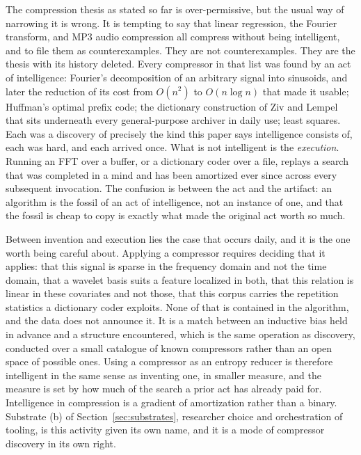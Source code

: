 \documentclass[11pt]{article}
\begin{document}
The compression thesis as stated so far is over-permissive, but the usual way of narrowing it is wrong. It is tempting to say that linear regression, the Fourier transform, and MP3 audio compression all compress without being intelligent, and to file them as counterexamples. They are not counterexamples. They are the thesis with its history deleted. Every compressor in that list was found by an act of intelligence: Fourier's decomposition of an arbitrary signal into sinusoids, and later the reduction of its cost from $O(n^2)$ to $O(n\log n)$ that made it usable; Huffman's optimal prefix code; the dictionary construction of Ziv and Lempel that sits underneath every general-purpose archiver in daily use; least squares. Each was a discovery of precisely the kind this paper says intelligence consists of, each was hard, and each arrived once. What is not intelligent is the \emph{execution}. Running an FFT over a buffer, or a dictionary coder over a file, replays a search that was completed in a mind and has been amortized ever since across every subsequent invocation. The confusion is between the act and the artifact: an algorithm is the fossil of an act of intelligence, not an instance of one, and that the fossil is cheap to copy is exactly what made the original act worth so much.

Between invention and execution lies the case that occurs daily, and it is the one worth being careful about. Applying a compressor requires deciding that it applies: that this signal is sparse in the frequency domain and not the time domain, that a wavelet basis suits a feature localized in both, that this relation is linear in these covariates and not those, that this corpus carries the repetition statistics a dictionary coder exploits. None of that is contained in the algorithm, and the data does not announce it. It is a match between an inductive bias held in advance and a structure encountered, which is the same operation as discovery, conducted over a small catalogue of known compressors rather than an open space of possible ones. Using a compressor as an entropy reducer is therefore intelligent in the same sense as inventing one, in smaller measure, and the measure is set by how much of the search a prior act has already paid for. Intelligence in compression is a gradient of amortization rather than a binary. Substrate (b) of Section~\ref{sec:substrates}, researcher choice and orchestration of tooling, is this activity given its own name, and it is a mode of compressor discovery in its own right.
\end{document}
